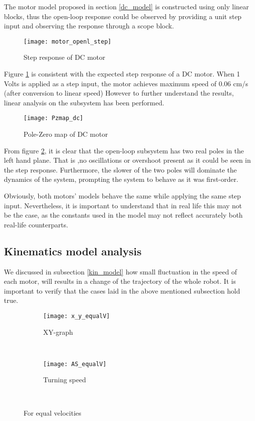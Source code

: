 The motor model proposed in section \ref{dc_model} is constructed using only linear blocks, thus the open-loop response could be observed by providing a unit step input and observing the response through a scope block. 

\begin{figure}[h]
\centering
\texttt{[image: motor\_openl\_step]}
\caption{Step response of DC motor}
\label{fig::dc_step}
\end{figure} 

Figure \ref{fig::dc_step} is consistent with the expected step response of a DC motor. When 1 Volts is applied as a step input, the motor achieves maximum speed of 0.06 cm/s (after conversion to linear speed) However to further understand the results, linear analysis on the subsystem has been performed.

\begin{figure}[h]
\centering
\texttt{[image: Pzmap\_dc]}
\caption{Pole-Zero map of DC motor}
\label{fig::dc_pz}
\end{figure} 

From figure \ref{fig::dc_pz}, it is clear that the open-loop subsystem has two real poles in the left hand plane. That is ,no oscillations or overshoot present as it could be seen in the step response. Furthermore, the slower of the two poles will dominate the dynamics of the system, prompting the system to behave as it was first-order. 

Obviously, both motors' models behave the same while applying the same step input. Nevertheless, it is important to understand that in real life this may not be the case, as the constants used in the model may not reflect accurately both real-life counterparts.

\subsection{Kinematics model analysis} \label{kin_analysis}

We discussed in subsection \ref{kin_model} how small fluctuation in the speed of each motor, will results in a change of the trajectory of the whole robot. It is important to verify that the cases laid in the above mentioned subsection hold true.

\begin{figure}[h]
    \centering
    \begin{subfigure}[h]{0.47\textwidth}
        \texttt{[image: x\_y\_equalV]}
        \caption{XY-graph}
        \label{fig:v_l=v_r}
    \end{subfigure}
    ~ %
    \begin{subfigure}[h]{0.47\textwidth}
        \texttt{[image: AS\_equalV]}
        \caption{Turning speed}
        \label{fig:Wv_l=v_r}
    \end{subfigure}
    ~ %
    \caption{For equal velocities}\label{fig:eqV}
\end{figure}

